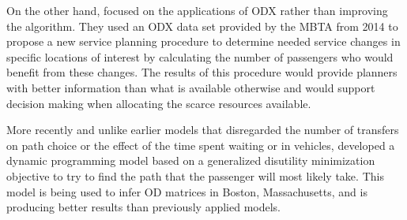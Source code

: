 \documentclass[11pt,twoside]{article}
\numberwithin{equation}{section}
\newcommand{\?}{\stackrel{?}{=}}
\begin{document}
On the other hand, \citet{vanderwaartApplicationsInferredOrigins2017} focused on the applications of ODX rather than improving the algorithm. They used an ODX data set provided by the MBTA from 2014 to propose a new service planning procedure to determine needed service changes in specific locations of interest by calculating the number of passengers who would benefit from these changes. The results of this procedure would provide planners with better information than what is available otherwise and would support decision making when allocating the scarce resources available.

More recently and unlike earlier models that disregarded the number of transfers on path choice or the effect of the time spent waiting or in vehicles, \citet{sanchez-martinezInferencePublicTransportation2017} developed a dynamic programming model based on a generalized disutility minimization objective to try to find the path that the passenger will most likely take. This model is being used to infer OD matrices in Boston, Massachusetts, and is producing better results than previously applied models.








%




\end{document}

